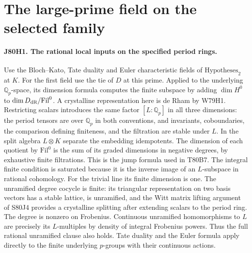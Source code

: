 \section{The large-prime field on the selected family}

\paragraph{J80H1. The rational local inputs on the specified period rings.}
Use the Bloch--Kato, Tate duality and Euler characteristic fields of
$\mathrm{Hypotheses}_2$ at $K$. For the first field use the tie of
$D$ at this prime. Applied to the underlying $\mathbb Q_p$-space,
its dimension formula computes the finite subspace by adding
$\dim H^0$ to $\dim D_{\rm dR}/\mathrm{Fil}^0$. A crystalline
representation here is de Rham by W79H1. Restricting scalars
introduces the same factor $[L:\mathbb Q_p]$ in all three
dimensions: the period tensors are over $\mathbb Q_p$ in both
conventions, and invariants, coboundaries, the comparison defining
finiteness, and the filtration are stable under $L$. In the split
algebra $L\otimes K$ separate the embedding idempotents. The dimension
of each quotient by $\mathrm{Fil}^0$ is the sum of its graded
dimensions in negative degrees, by exhaustive finite filtrations.
This is the jump formula used in T80B7. The integral finite condition
is saturated because it is the inverse image of an $L$-subspace in
rational cohomology. For the trivial line its finite dimension is
one. The unramified degree cocycle is finite: its triangular
representation on two basis vectors has a stable lattice, is
unramified, and the Witt matrix lifting argument of S80J4 provides
a crystalline splitting after extending scalars to the period ring.
The degree is nonzero on Frobenius. Continuous unramified
homomorphisms to $L$ are precisely its $L$-multiples by density
of integral Frobenius powers. Thus the full rational unramified
clause also holds. Tate duality and the Euler formula apply directly
to the finite underlying $p$-groups with their continuous actions.

